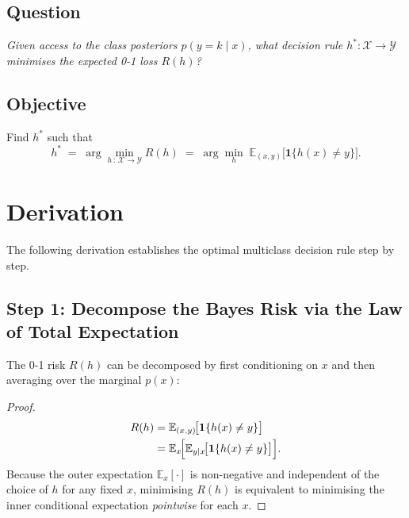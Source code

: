 \documentclass[11pt]{article}
\theoremstyle{definition}
\theoremstyle{remark}
\newcommand{\E}{\mathbb{E}}
\begin{document}
\subsection{Question}

\emph{Given access to the class posteriors $p(y = k \mid x)$, what decision rule
$h^{*} : \mathcal{X} \to \mathcal{Y}$ minimises the expected 0-1 loss $R(h)$?}

\subsection{Objective}

Find $h^{*}$ such that
\[
    h^{*} \;=\; \arg\min_{h\,:\,\mathcal{X}\to\mathcal{Y}} R(h)
             \;=\; \arg\min_{h} \;\E_{(x,y)}\!\bigl[\mathbf{1}\{h(x) \neq y\}\bigr].
\]

\section{Derivation}

The following derivation establishes the optimal multiclass decision rule
step by step.

\subsection{Step 1: Decompose the Bayes Risk via the Law of Total Expectation}

The 0-1 risk $R(h)$ can be decomposed by first conditioning on $x$ and then
averaging over the marginal $p(x)$:

\begin{proof}
    \begin{align}
        R(h)
        &= \E_{(x,y)}\!\bigl[\mathbf{1}\{h(x) \neq y\}\bigr] \notag \\
        &= \E_{x}\!\Bigl[\E_{y \mid x}\!\bigl[\mathbf{1}\{h(x) \neq y\}\bigr]\Bigr].
        \label{eq:step1}
    \end{align}
    Because the outer expectation $\E_{x}[\cdot]$ is non-negative and independent
    of the choice of $h$ for any fixed $x$, minimising $R(h)$ is equivalent to
    minimising the inner conditional expectation \emph{pointwise} for each $x$.
\end{proof}
\end{document}
